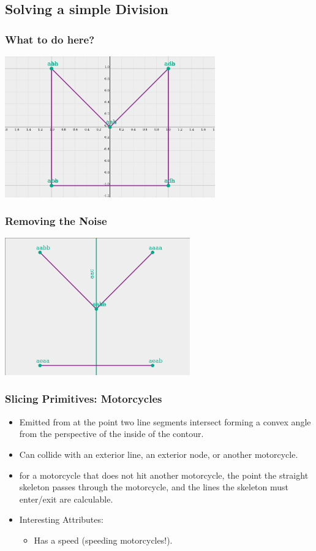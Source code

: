 \documentclass[hyperref={pdfpagemode=FullScreen},aspectratio=169]{beamer}
\begin{document}
\subsection {Solving a simple Division}

\begin{frame}
  \frametitle{What to do here?}
  \includegraphics[width=0.68\textwidth, center]{C3.png}
\end{frame}

\begin{frame}
  \frametitle{Removing the Noise}
  \includegraphics[width=0.6\textwidth, center]{C3-motorcycle-nogrid.png}
\end{frame}

\begin{frame}
  \frametitle{Slicing Primitives: Motorcycles}
  \begin{itemize}
  \item Emitted from at the point two line segments intersect forming a convex angle from the perspective of the inside of the contour.
  \item Can collide with an exterior line, an exterior node, or another motorcycle.
  \item for a motorcycle that does not hit another motorcycle, the point the straight skeleton passes through the motorcycle, and the lines the skeleton must enter/exit are calculable.
  \item Interesting Attributes:
    \begin {itemize}
      \item Has a speed (speeding motorcycles!).
    \end{itemize}
  \end{itemize}
\end{frame}
\end{document}
